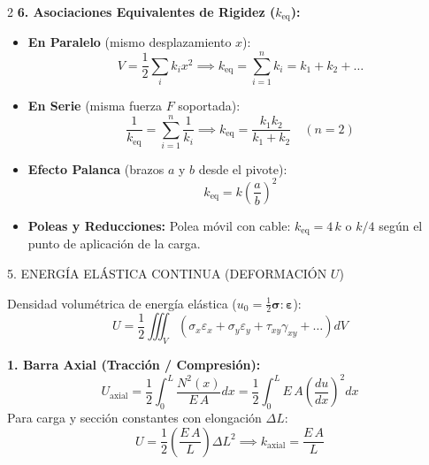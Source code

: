 \documentclass[10pt,a4paper]{article}
\newcommand{\seccion}[1]{%
  \vspace{2mm}%
  \noindent\colorbox{urlblue}{\parbox{\dimexpr\linewidth-2\fboxsep\relax}{%
    \color{white}\footnotesize\bfseries\strut\MakeUppercase{#1}}}%
  \vspace{1.5mm}%
}
\begin{document}
\begin{multicols}{2}
\textbf{6. Asociaciones Equivalentes de Rigidez ($k_{\text{eq}}$):}
\begin{itemize}\setlength{\itemsep}{1pt}\setlength{\parskip}{0pt}
  \item \textbf{En Paralelo} (mismo desplazamiento $x$):
    \begin{equation*}
      V = \frac{1}{2}\sum_i k_i x^2 \implies k_{\text{eq}} = \sum_{i=1}^n k_i = k_1 + k_2 + \dots
    \end{equation*}
  \item \textbf{En Serie} (misma fuerza $F$ soportada):
    \begin{equation*}
      \frac{1}{k_{\text{eq}}} = \sum_{i=1}^n \frac{1}{k_i} \implies k_{\text{eq}} = \frac{k_1 k_2}{k_1 + k_2} \quad (n=2)
    \end{equation*}
  \item \textbf{Efecto Palanca} (brazos $a$ y $b$ desde el pivote):
    \begin{equation*}
      k_{\text{eq}} = k \left(\frac{a}{b}\right)^2
    \end{equation*}
  \item \textbf{Poleas y Reducciones:}
    Polea móvil con cable: $k_{\text{eq}} = 4\,k$ o $k/4$ según el punto de aplicación de la carga.
\end{itemize}

\seccion{5. Energía Elástica Continua (Deformación $U$)}

Densidad volumétrica de energía elástica ($u_0 = \frac{1}{2}\boldsymbol{\sigma}:\boldsymbol{\varepsilon}$):
\begin{equation*}
  U = \frac{1}{2}\iiint_V \left( \sigma_x\varepsilon_x + \sigma_y\varepsilon_y + \tau_{xy}\gamma_{xy} + \dots \right) dV
\end{equation*}

\textbf{1. Barra Axial (Tracción / Compresión):}
\begin{equation*}
  U_{\text{axial}} = \frac{1}{2}\int_0^L \frac{N^2(x)}{E\,A} dx = \frac{1}{2}\int_0^L E\,A\left(\frac{du}{dx}\right)^2 dx
\end{equation*}
Para carga y sección constantes con elongación $\Delta L$:
\begin{equation*}
  U = \frac{1}{2}\left(\frac{E\,A}{L}\right)\Delta L^2 \implies k_{\text{axial}} = \frac{E\,A}{L}
\end{equation*}


\end{multicols}
\end{document}
